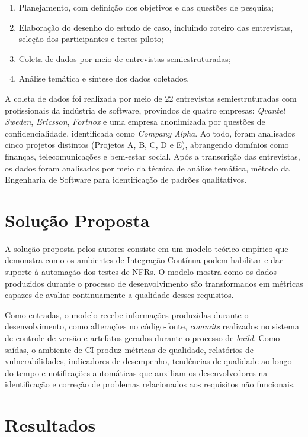 \documentclass[12pt]{article}
\begin{document}
\begin{enumerate}
    \item Planejamento, com definição dos objetivos e das questões de pesquisa;
    \item Elaboração do desenho do estudo de caso, incluindo roteiro das entrevistas, seleção dos participantes e testes-piloto;
    \item Coleta de dados por meio de entrevistas semiestruturadas;
    \item Análise temática e síntese dos dados coletados.
\end{enumerate}

A coleta de dados foi realizada por meio de 22 entrevistas semiestruturadas com profissionais da indústria de software, provindos de quatro empresas: \textit{Qvantel Sweden}, \textit{Ericsson}, \textit{Fortnox} e uma empresa anonimizada por questões de confidencialidade, identificada como \textit{Company Alpha}. Ao todo, foram analisados cinco projetos distintos (Projetos A, B, C, D e E), abrangendo domínios como finanças, telecomunicações e bem-estar social. Após a transcrição das entrevistas, os dados foram analisados por meio da técnica de análise temática, método da Engenharia de Software para identificação de padrões qualitativos.

\section{Solução Proposta}

A solução proposta pelos autores consiste em um modelo teórico-empírico que demonstra como os ambientes de Integração Contínua podem habilitar e dar suporte à automação dos testes de NFRs. O modelo mostra como os dados produzidos durante o processo de desenvolvimento são transformados em métricas capazes de avaliar continuamente a qualidade desses requisitos.

Como entradas, o modelo recebe informações produzidas durante o desenvolvimento, como alterações no código-fonte, \textit{commits} realizados no sistema de controle de versão e artefatos gerados durante o processo de \textit{build}. Como saídas, o ambiente de CI produz métricas de qualidade, relatórios de vulnerabilidades, indicadores de desempenho, tendências de qualidade ao longo do tempo e notificações automáticas que auxiliam os desenvolvedores na identificação e correção de problemas relacionados aos requisitos não funcionais.

\section{Resultados}
\end{document}
